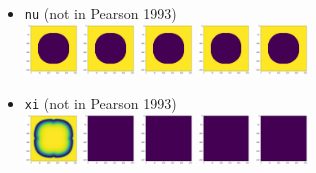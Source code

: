 \begin{itemize}
\item {\tt nu} (not in Pearson 1993)\\
\includegraphics[width=1.4cm]{python_codes/fieldstone_171/pearson93/nu_solution_0001000_u}
\includegraphics[width=1.4cm]{python_codes/fieldstone_171/pearson93/nu_solution_0010000_u}
\includegraphics[width=1.4cm]{python_codes/fieldstone_171/pearson93/nu_solution_0030000_u}
\includegraphics[width=1.4cm]{python_codes/fieldstone_171/pearson93/nu_solution_0050000_u}
\includegraphics[width=1.4cm]{python_codes/fieldstone_171/pearson93/nu_solution_final_u}

\item {\tt xi} (not in Pearson 1993)\\
\includegraphics[width=1.4cm]{python_codes/fieldstone_171/pearson93/xi_solution_0001000_u}
\includegraphics[width=1.4cm]{python_codes/fieldstone_171/pearson93/xi_solution_0010000_u}
\includegraphics[width=1.4cm]{python_codes/fieldstone_171/pearson93/xi_solution_0030000_u}
\includegraphics[width=1.4cm]{python_codes/fieldstone_171/pearson93/xi_solution_0050000_u}
\includegraphics[width=1.4cm]{python_codes/fieldstone_171/pearson93/xi_solution_final_u}


\end{itemize}
